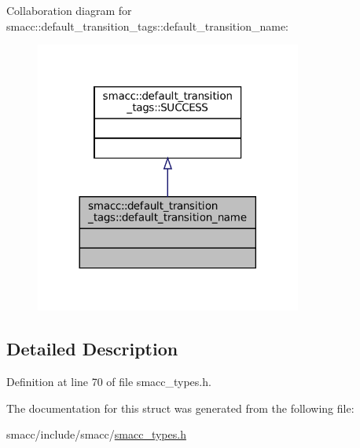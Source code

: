 Collaboration diagram for smacc\+:\+:default\+\_\+transition\+\_\+tags\+:\+:default\+\_\+transition\+\_\+name\+:
\nopagebreak
\begin{figure}[H]
\begin{center}
\leavevmode
\includegraphics[width=248pt]{structsmacc_1_1default__transition__tags_1_1default__transition__name__coll__graph}
\end{center}
\end{figure}


\subsection{Detailed Description}


Definition at line 70 of file smacc\+\_\+types.\+h.



The documentation for this struct was generated from the following file\+:\begin{DoxyCompactItemize}
\item 
smacc/include/smacc/\hyperlink{smacc__types_8h}{smacc\+\_\+types.\+h}\end{DoxyCompactItemize}
